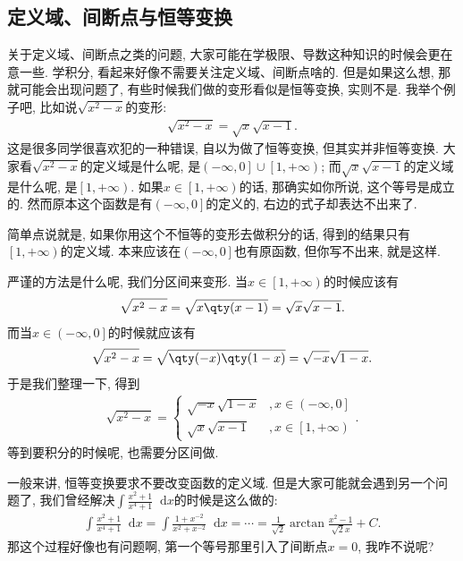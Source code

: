 \documentclass{ctexbook}
\newcommand*{\dif}{\mathop{}\!\mathrm{d}}
\begin{document}
{\subsection{定义域、间断点与恒等变换}
关于定义域、间断点之类的问题, 大家可能在学极限、导数这种知识的时候会更在意一些. 学积分, 看起来好像不需要关注定义域、间断点啥的. 但是如果这么想, 那就可能会出现问题了, 有些时候我们做的变形看似是恒等变换, 实则不是. 我举个例子吧, 比如说$\sqrt{x^{2}-x}$的变形: 
\begin{align*}
\sqrt{x^{2}-x}=\sqrt{x}\sqrt{x-1}
.\end{align*}
这是很多同学很喜欢犯的一种错误, 自以为做了恒等变换, 但其实并非恒等变换. 大家看$\sqrt{x^{2}-x}$的定义域是什么呢, 是$\left(-\infty,0\right]\cup\left[1,+\infty\right)$; 而$\sqrt{x}\sqrt{x-1}$的定义域是什么呢, 是$\left[1,+\infty\right)$. 如果$x\in\left[1,+\infty\right)$的话, 那确实如你所说, 这个等号是成立的. 然而原本这个函数是有$\left(-\infty,0\right]$的定义的, 右边的式子却表达不出来了. \par
简单点说就是, 如果你用这个不恒等的变形去做积分的话, 得到的结果只有$\left[1,+\infty\right)$的定义域. 本来应该在$\left(-\infty,0\right]$也有原函数, 但你写不出来, 就是这样. \par
严谨的方法是什么呢, 我们分区间来变形. 当$x\in\left[1,+\infty\right)$的时候应该有
\begin{align*}
\sqrt{x^{2}-x}=\sqrt{x\qty(x-1)}=\sqrt{x}\sqrt{x-1}
.\end{align*}
而当$x\in\left(-\infty,0\right]$的时候就应该有
\begin{align*}
\sqrt{x^{2}-x}=\sqrt{\qty(-x)\qty(1-x)}=\sqrt{-x}\sqrt{1-x}
.\end{align*}
于是我们整理一下, 得到
\begin{align*}
\sqrt{x^{2}-x}=\begin{cases}
\sqrt{-x}\sqrt{1-x}&,x\in\left(-\infty,0\right]\\
\sqrt{x}\sqrt{x-1}&,x\in\left[1,+\infty\right)
\end{cases}
.\end{align*}
等到要积分的时候呢, 也需要分区间做. \par
一般来讲, 恒等变换要求不要改变函数的定义域. 但是大家可能就会遇到另一个问题了, 我们曾经解决$\int\frac{x^{2}+1}{x^{4}+1}\dif{x}$的时候是这么做的: 
\begin{align*}
\int\frac{x^{2}+1}{x^{4}+1}\dif{x}=\int\frac{1+x^{-2}}{x^{2}+x^{-2}}\dif{x}=\cdots=\frac{1}{\sqrt{2}}\arctan{\frac{x^{2}-1}{\sqrt{2}x}}+C
.\end{align*}
那这个过程好像也有问题啊, 第一个等号那里引入了间断点$x=0$, 我咋不说呢? \par
}
\end{document}
